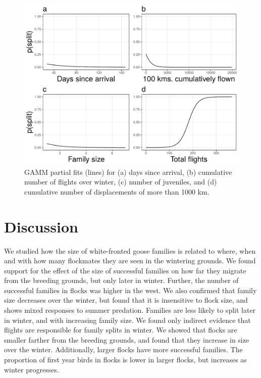 \documentclass[10pt,twocolumn]{paper}
\begin{document}
\begin{figure}
\includegraphics[width = 1\linewidth]{split_dayprob.pdf}
\caption{{\small GAMM partial fits (lines) for (a) days since arrival, (b) cumulative number of flights over winter, (c) number of juveniles, and (d) cumulative number of displacements of more than 1000 km.}}
\end{figure}

\section{Discussion}\label{discussion}

We studied how the size of white-fronted goose families is related to
where, when and with how many flockmates they are seen in the wintering
grounds. We found support for the effect of the size of successful
families on how far they migrate from the breeding grounds, but only
later in winter. Further, the number of successful families in flocks
was higher in the west. We also confirmed that family size decreases
over the winter, but found that it is insensitive to flock size, and
shows mixed responses to summer predation. Families are less likely to
split later in winter, and with increasing family size. We found only
indirect evidence that flights are responsible for family splits in
winter. We showed that flocks are smaller farther from the breeding
grounds, and found that they increase in size over the winter.
Additionally, larger flocks have more successful families. The
proportion of first year birds in flocks is lower in larger flocks, but
increases as winter progresses.
\end{document}

